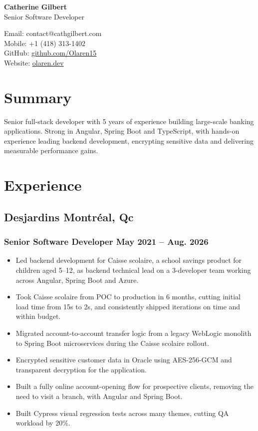 \documentclass[10pt]{article} %
\begin{document}
\begin{center}
	\begin{minipage}[c]{0.56\textwidth}
		\raggedright
		{\Huge\bfseries Catherine Gilbert} \\[2pt]
		Senior Software Developer
	\end{minipage} \hfill
	\begin{minipage}[c]{0.42\textwidth}
		\raggedleft
		\small
		Email: contact@cathgilbert.com \\
		Mobile: +1 (418) 313-1402 \\
		GitHub: \href{https://github.com/Olaren15}{github.com/Olaren15} \\
		Website: \href{https://olaren.dev/en/}{olaren.dev}
	\end{minipage}
\end{center}


\section{Summary}
Senior full-stack developer with 5 years of experience building large-scale banking
applications. Strong in Angular, Spring Boot and TypeScript, with hands-on
experience leading backend development, encrypting sensitive data and
delivering measurable performance gains.


\section{Experience}
\subsection{Desjardins \hfill Montréal, Qc}
\subsubsection{Senior Software Developer \hfill May 2021 -- Aug. 2026}
\begin{itemize}
	\item Led backend development for Caisse scolaire, a school savings product
        for children aged 5--12, as backend technical lead on a 3-developer
        team working across Angular, Spring Boot and Azure.
	\item Took Caisse scolaire from POC to production in 6 months, cutting
        initial load time from 15s to 2s, and consistently shipped iterations
        on time and within budget.
	\item Migrated account-to-account transfer logic from a legacy WebLogic
        monolith to Spring Boot microservices during the Caisse scolaire
        rollout.
	\item Encrypted sensitive customer data in Oracle using AES-256-GCM
        and transparent decryption for the application.
	\item Built a fully online account-opening flow for prospective clients,
        removing the need to visit a branch, with Angular and Spring Boot.
	\item Built Cypress visual regression tests across many themes, cutting QA
        workload by 20\%.
\end{itemize}
\end{document}

